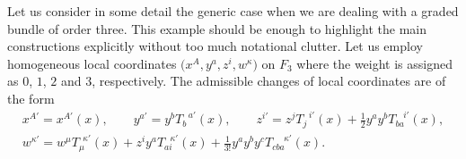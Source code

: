 \documentclass[pdftex]{sigma}
\numberwithin{equation}{section}
\begin{document}
\begin{Example}\label{exmpl:F3}
Let us consider in some detail the generic case when we are dealing with a graded bundle of order three. This example should be enough to highlight the main constructions explicitly without too much notational clutter. Let us employ homogeneous local coordinates $\big(x^{A}, y^{a}, z^{i},w^{\kappa}\big)$ on $F_{3}$ where the weight is assigned as $0$, $1$, $2$ and $3$, respectively. The admissible changes of local coordinates are of the form
\begin{gather*}
 x^{A'} = x^{A'}(x), \qquad  y^{a'} = y^{b}T_{b}^{\:\:\: a'}(x), \qquad  z^{i'} = z^{j}T_{j}^{\:\:\: i'}(x) + \frac{1}{2}y^{a}y^{b}T_{ba}^{\:\:\:\: i'}(x),\\
w^{\kappa'} = w^{\mu}T_{\mu}^{\:\: \kappa'}(x) + z^{i}y^{a}T_{ai}^{\:\:\: \kappa'}(x) + \frac{1}{3!}y^{a}y^{b}y^{c}T_{cba}^{\:\:\:\:\:\: \kappa'}(x). \end{gather*}


\end{Example}
\end{document}
